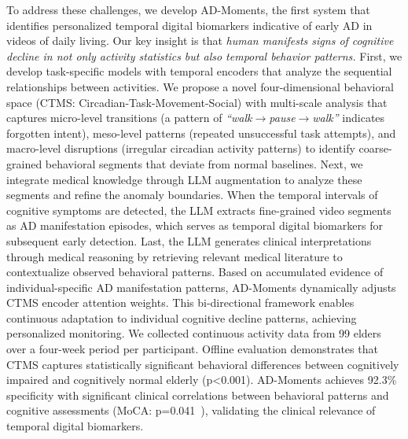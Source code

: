 \documentclass[sigconf, anonymous, 9pt, nonacm]{acmart}
\newcommand{\sys}{AD-Moments\xspace}
\begin{document}
To address these challenges, we develop \sys, the first system that identifies personalized temporal digital biomarkers indicative of early AD in videos of daily living.
Our key insight is that \emph{human manifests signs of cognitive decline in not only activity statistics but also temporal behavior patterns.}
First, we develop task-specific models with temporal encoders that analyze the sequential relationships between activities. 
We propose a novel four-dimensional behavioral space (CTMS: Circadian-Task-Movement-Social) with multi-scale analysis that captures micro-level transitions (a pattern of \emph{``walk$\rightarrow$pause$\rightarrow$walk''} indicates forgotten intent), meso-level patterns (repeated unsuccessful task attempts), and macro-level disruptions (irregular circadian activity patterns) to identify coarse-grained behavioral segments that deviate from normal baselines.
Next, we integrate medical knowledge through LLM augmentation to analyze these segments and refine the anomaly boundaries. 
When the temporal intervals of cognitive symptoms are detected, the LLM extracts fine-grained video segments as AD manifestation episodes, which serves as temporal digital biomarkers for subsequent early detection.
Last, the LLM generates clinical interpretations through medical reasoning by retrieving relevant medical literature to contextualize observed behavioral patterns.
Based on accumulated evidence of individual-specific AD manifestation patterns, \sys dynamically adjusts CTMS encoder attention weights.
This bi-directional framework enables continuous adaptation to individual cognitive decline patterns, achieving personalized monitoring.
We collected continuous activity data from 99 elders over a four-week period per participant. Offline evaluation demonstrates that CTMS captures statistically significant behavioral differences between cognitively impaired and cognitively normal elderly (p<0.001).
\sys achieves 92.3\% specificity with significant clinical correlations between behavioral patterns and cognitive assessments (MoCA: p=0.041~\cite{Nasreddine2005MoCA}), validating the clinical relevance of temporal digital biomarkers.
\end{document}
